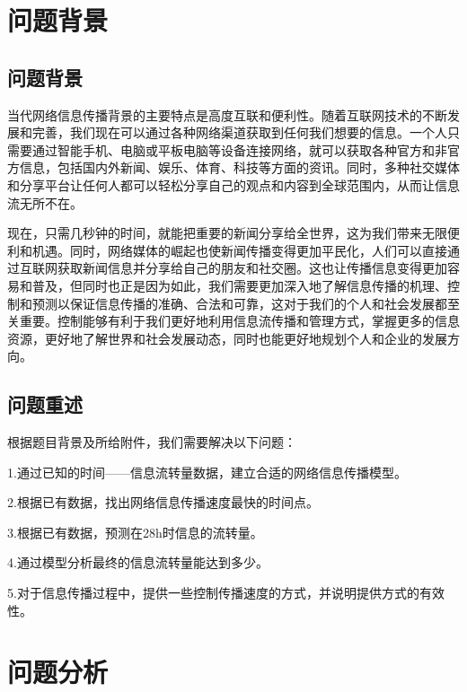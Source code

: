 \documentclass[UTF8]{ctexart}
\begin{document}
\newpage

\pagestyle{plain}


\section{问题背景}
\subsection{问题背景}
当代网络信息传播背景的主要特点是高度互联和便利性。随着互联网技术的不断发展和完善，我们现在可以通过各种网络渠道获取到任何我们想要的信息。一个人只需要通过智能手机、电脑或平板电脑等设备连接网络，就可以获取各种官方和非官方信息，包括国内外新闻、娱乐、体育、科技等方面的资讯。同时，多种社交媒体和分享平台让任何人都可以轻松分享自己的观点和内容到全球范围内，从而让信息流无所不在。\par
现在，只需几秒钟的时间，就能把重要的新闻分享给全世界，这为我们带来无限便利和机遇。同时，网络媒体的崛起也使新闻传播变得更加平民化，人们可以直接通过互联网获取新闻信息并分享给自己的朋友和社交圈。这也让传播信息变得更加容易和普及，但同时也正是因为如此，我们需要更加深入地了解信息传播的机理、控制和预测以保证信息传播的准确、合法和可靠，这对于我们的个人和社会发展都至关重要。控制能够有利于我们更好地利用信息流传播和管理方式，掌握更多的信息资源，更好地了解世界和社会发展动态，同时也能更好地规划个人和企业的发展方向。\par 

\subsection{问题重述}
根据题目背景及所给附件，我们需要解决以下问题：\par
1.通过已知的时间——信息流转量数据，建立合适的网络信息传播模型。\par
2.根据已有数据，找出网络信息传播速度最快的时间点。\par
3.根据已有数据，预测在28h时信息的流转量。\par
4.通过模型分析最终的信息流转量能达到多少。\par 
5.对于信息传播过程中，提供一些控制传播速度的方式，并说明提供方式的有效性。\par 

\section{问题分析}
\end{document}
